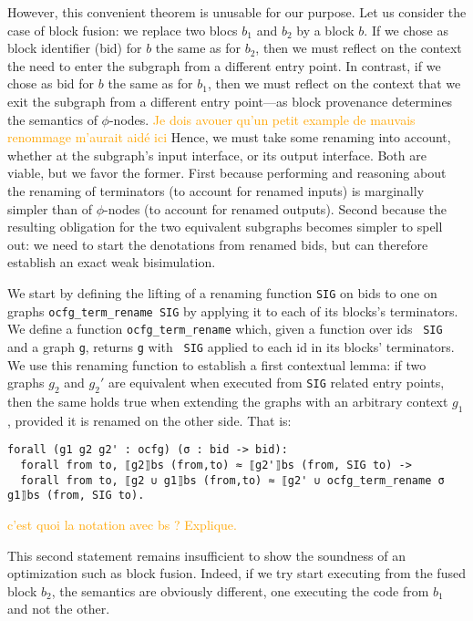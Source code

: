 \documentclass[11pt]{article}
\newcommand{\inlinecoq}[1]{\mbox{\lstinline[style=customcoq,columns=fixed,basewidth=.48em]{#1}}}
\newcommand{\ilc}[1]{\inlinecoq{#1}}
\newcommand{\gr}[1]{\textcolor{Orange}{#1}}
\newcommand{\yzt}[1]{\textcolor{ForestGreen!50}{#1}}
\begin{document}
\yzt{However, this convenient theorem is unusable for our purpose. Let us consider the case of block fusion: we replace two blocs $b_1$ and $b_2$ by a block $b$.
If we chose as block identifier (bid) for $b$ the same as for $b_2$, then we must reflect on the context the need to enter the subgraph from a different entry point.
In contrast, if we chose as bid for $b$ the same as for $b_1$, then we must reflect on the context that we exit the subgraph from a different entry point---as block provenance determines the semantics of $\phi$-nodes.}
\gr{Je dois avouer qu'un petit example de mauvais renommage m'aurait aidé ici}
\yzt{Hence, we must take some renaming into account, whether at the subgraph's input interface, or its output interface. Both are viable, but we favor the former. First because performing and reasoning about the renaming of terminators (to account for renamed inputs) is marginally simpler than of $\phi$-nodes (to account for renamed outputs). Second because the resulting obligation for the two equivalent subgraphs becomes simpler to spell out: we need to start the denotations from renamed bids, but can therefore establish an exact weak bisimulation.}

We start by defining the lifting of a renaming function \ilc{SIG} on bids to one on graphs \ilc{ocfg_term_rename SIG} by applying it to each of its blocks's terminators.
We define a function \ilc{ocfg_term_rename} which, given a function over ids~ \ilc{SIG} and a graph \ilc{g}, returns \ilc{g} with~ \ilc{SIG} applied to each id in its blocks' terminators.
We use this renaming function to establish a first contextual lemma: if two graphs $g_2$ and $g_2'$ are equivalent when executed from \ilc{SIG} related entry points, then the same holds true when extending the graphs with an arbitrary context $g_1$, provided it is renamed on the other side. That is:
  \begin{lstlisting}[style=customcoq,basicstyle=\small\ttfamily]
forall (g1 g2 g2' : ocfg) (σ : bid -> bid):
  forall from to, ⟦g2⟧bs (from,to) ≈ ⟦g2'⟧bs (from, SIG to) ->
  forall from to, ⟦g2 ∪ g1⟧bs (from,to) ≈ ⟦g2' ∪ ocfg_term_rename σ g1⟧bs (from, SIG to).
  \end{lstlisting}

\gr{c'est quoi la notation avec bs ? Explique.}

This second statement remains insufficient to show the soundness of an optimization such as block fusion. Indeed, if we try start executing from the fused block $b_2$, the semantics are obviously different, one executing the code from $b_1$ and not the other.
\end{document}
